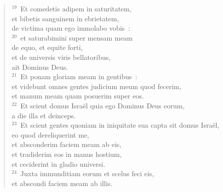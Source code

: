 \begin{flushleft}
\begin{verse}
${}^{19}$~Et comedetis adipem in saturitatem,\\ et bibetis sanguinem in ebrietatem,\\ de victima quam ego immolabo vobis~:\\
${}^{20}$~et saturabimini super mensam meam\\ de equo, et equite forti,\\ et de universis viris bellatoribus,\\ ait Dominus Deus.\\
${}^{21}$~Et ponam gloriam meam in gentibus~:\\ et videbunt omnes gentes judicium meum quod fecerim,\\ et manum meam quam posuerim super eos.\\
${}^{22}$~Et scient domus Isra\"el quia ego Dominus Deus eorum,\\ a die illa et deinceps.\\
${}^{23}$~Et scient gentes quoniam in iniquitate sua capta sit domus Isra\"el,\\ eo quod dereliquerint me,\\ et absconderim faciem meam ab eis,\\ et tradiderim eos in manus hostium,\\ et ceciderint in gladio universi.\\
${}^{24}$~Juxta immunditiam eorum et scelus feci eis,\\ et abscondi faciem meam ab illis.\end{verse}\end{flushleft}


